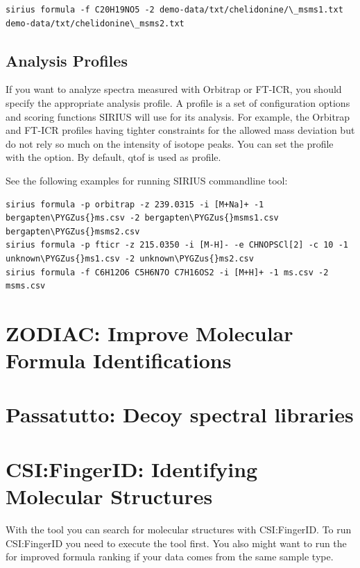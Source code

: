 \documentclass[letterpaper,10pt,openany,oneside]{sphinxmanual}
\def\PYGZus{\char`\_}
\begin{document}
\begin{Verbatim}[commandchars=\\\{\}]
sirius formula -f C20H19NO5 -2 demo-data/txt/chelidonine/\_msms1.txt demo-data/txt/chelidonine\_msms2.txt
\end{Verbatim}

\subsection*{Analysis Profiles}
If you want to analyze spectra measured with Orbitrap or FT-ICR, you should specify the appropriate analysis profile. A profile is a set of configuration options and scoring functions SIRIUS will use for its analysis. For example, the Orbitrap and FT-ICR profiles having tighter constraints for the allowed mass deviation but do not rely so much on the intensity of isotope peaks. You can set the profile with the  option. By default, qtof is used as profile.


See the following examples for running SIRIUS commandline tool:

\begin{Verbatim}[commandchars=\\\{\}]
sirius formula -p orbitrap -z 239.0315 -i [M+Na]+ -1 bergapten\PYGZus{}ms.csv -2 bergapten\PYGZus{}msms1.csv bergapten\PYGZus{}msms2.csv
sirius formula -p fticr -z 215.0350 -i [M-H]- -e CHNOPSCl[2] -c 10 -1 unknown\PYGZus{}ms1.csv -2 unknown\PYGZus{}ms2.csv
sirius formula -f C6H12O6 C5H6N7O C7H16OS2 -i [M+H]+ -1 ms.csv -2 msms.csv
\end{Verbatim}

\section{ZODIAC: Improve Molecular Formula Identifications}

\section{Passatutto: Decoy spectral libraries}

\section{CSI:FingerID: Identifying Molecular Structures}
\label{commandline:identifying-molecular-structures}

With the  tool you can search for molecular structures with
CSI:FingerID. To run CSI:FingerID you need to execute the  tool first. You also might want to run the  for improved formula ranking if your data comes from the same sample type. 
\end{document}
